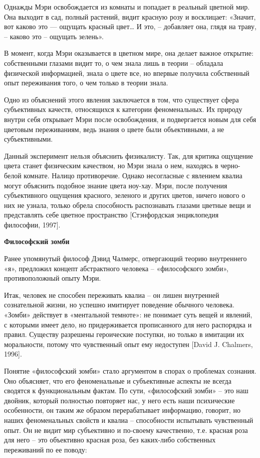 Однажды Мэри освобождается из комнаты и попадает в реальный цветной мир. Она выходит в сад, полный растений, видит красную розу и восклицает: «Значит, вот каково это — ощущать красный цвет… И это, – добавляет она, глядя на траву, – каково это – ощущать зелень».

В момент, когда Мэри оказывается в цветном мире, она делает важное открытие: собственными глазами видит то, о чем знала лишь в теории – обладала физической информацией, знала о цвете все, но впервые получила собственный опыт переживания того, о чем только в теории знала.

Одно из объяснений этого явления заключается в том, что существует сфера субъективных качеств, относящихся к категории феноменальных. Их природу внутри себя открывает Мэри после освобождения, и подвергается новым для себя цветовым переживаниям, ведь знания о цвете были объективными, а не субъективными.

Данный эксперимент нельзя объяснить физикалисту. Так, для критика ощущение цвета станет физическим качеством, но Мэри знала о нем, находясь в черно-белой комнате. Налицо противоречие. Однако несогласные с явлением квалиа могут объяснить подобное знание цвета ноу-хау. Мэри, после получения субъективного ощущения красного, зеленого и других цветов, ничего нового о них не узнала, только обрела способность распознавать глазами цветные вещи и представлять себе цветное пространство [Стэнфордская энциклопедия философии, 1997].

\textbf{Философский зомби}

Ранее упомянутый философ Дэвид Чалмерс, отвергающий теорию внутреннего «я», предложил концепт абстрактного человека – «философского зомби», противоположный опыту Мэри.

Итак, человек не способен переживать квалиа – он лишен внутренней сознательной жизни, но успешно имитирует поведение обычного человека. «Зомби» действует в «ментальной темноте»: не понимает суть вещей и явлений, с которыми имеет дело, но придерживается прописанного для него распорядка и правил. Существу разрешены героические поступки, но только в имитации их моральности, потому что чувственный опыт ему недоступен [David J. Chalmers, 1996].

Понятие «философский зомби» стало аргументом в спорах о проблемах сознания. Оно объясняет, что его феноменальные и субъективные аспекты не всегда сводятся к функциональным фактам. По сути, «философский зомби» – это наш двойник, который полностью повторяет нас, у него есть наши психические особенности, он таким же образом перерабатывает информацию, говорит, но наших феноменальных свойств и квалиа – способности испытывать чувственный опыт. Он не видит мир субъективно и по-своему качественно, т.е. красная роза для него – это объективно красная роза, без каких-либо собственных переживаний по ее поводу:

